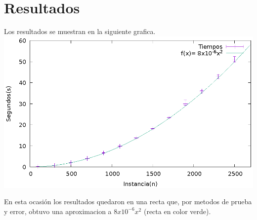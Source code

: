 \documentclass[12pt,letterpaper]{article}
\begin{document}
\section*{Resultados}
Los resultados se muestran en la siguiente grafica.\\
\includegraphics[scale=1]{tiempos} 


En esta ocasión los resultados quedaron en una recta que, por metodos de prueba y error, obtuvo una aproximacion a $8x10^{-6}x^2$ (recta en color verde).
\end{document}
